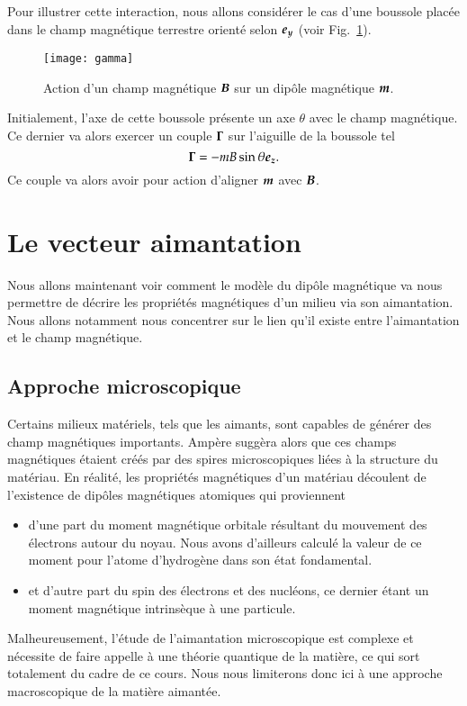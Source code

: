 Pour illustrer cette interaction, nous allons 
considérer le cas d'une boussole placée dans le champ magnétique terrestre orienté
selon $\ey$ (voir Fig.~\ref{fig:gamma}). 
\begin{figure}[htpb]
	\centering
	\texttt{[image: gamma]}
	\caption{Action d'un champ magnétique $\vecb$ sur un dipôle magnétique
	$\vecm$.}
	\label{fig:gamma}
\end{figure}
Initialement,
l'axe de cette boussole présente un axe $\theta$ avec le champ magnétique. Ce dernier
va alors exercer un couple $\mitbf{\Gamma}$ sur l'aiguille de la boussole tel
\begin{equation}
	\mitbf{\Gamma} = -mB\sin\theta \ez.
\end{equation}
Ce couple va alors avoir pour action d'aligner $\vecm$ avec $\vecb$.

\section{Le vecteur aimantation}
Nous allons maintenant voir comment le modèle du dipôle magnétique va nous permettre
de décrire les propriétés magnétiques d'un milieu via son aimantation. Nous allons 
notamment nous concentrer sur le lien qu'il existe entre l'aimantation et 
le champ magnétique.

\subsection{Approche microscopique}
Certains milieux matériels, tels que les aimants, sont capables de générer
des champ magnétiques importants. Ampère suggèra alors que ces champs magnétiques 
étaient créés par des spires microscopiques liées à la structure du matériau.
En réalité, les propriétés magnétiques d'un matériau découlent 
de l'existence de dipôles magnétiques atomiques qui proviennent
\begin{itemize}
	\item d'une part du moment magnétique orbitale résultant du mouvement des 
	  électrons autour du noyau. Nous avons d'ailleurs calculé la valeur de ce moment
	  pour l'atome d'hydrogène dans son état fondamental.
	\item et d'autre part du spin des électrons et des nucléons, 
	  ce dernier étant un moment magnétique intrinsèque à une particule. 
\end{itemize}
Malheureusement, l'étude de l'aimantation microscopique est complexe 
et nécessite de faire appelle à une théorie quantique de la matière, ce qui sort 
totalement du cadre de ce cours. Nous nous limiterons donc ici à une approche macroscopique
de la matière aimantée.

